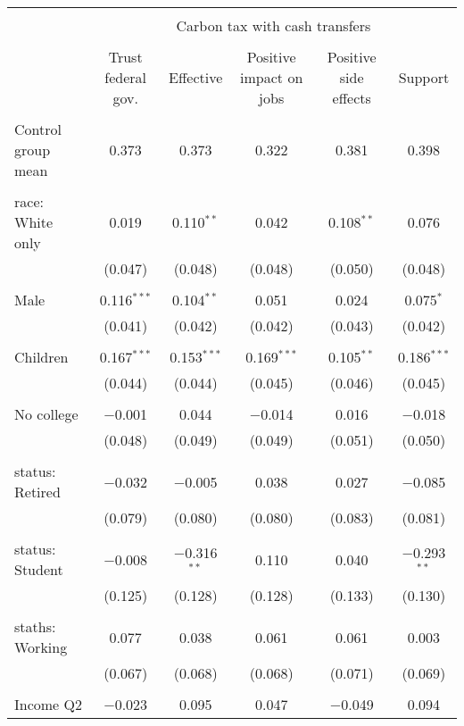 
\begin{tabular}{@{\extracolsep{5pt}}lccccc} 
\\[-1.8ex]\hline 
\hline \\[-1.8ex] 
 & \multicolumn{5}{c}{Carbon tax with cash transfers} \\ 
\cline{2-6} 
\\[-1.8ex] & Trust federal gov. & Effective & Positive impact on jobs & Positive side effects & Support \\ 
\hline \\[-1.8ex] 
 Control group mean & 0.373 & 0.373 & 0.322 & 0.381 & 0.398  \\ \hline \\[-1.8ex] race: White only & 0.019 & 0.110$^{**}$ & 0.042 & 0.108$^{**}$ & 0.076 \\ 
  & (0.047) & (0.048) & (0.048) & (0.050) & (0.048) \\ 
  & & & & & \\ 
 Male & 0.116$^{***}$ & 0.104$^{**}$ & 0.051 & 0.024 & 0.075$^{*}$ \\ 
  & (0.041) & (0.042) & (0.042) & (0.043) & (0.042) \\ 
  & & & & & \\ 
 Children & 0.167$^{***}$ & 0.153$^{***}$ & 0.169$^{***}$ & 0.105$^{**}$ & 0.186$^{***}$ \\ 
  & (0.044) & (0.044) & (0.045) & (0.046) & (0.045) \\ 
  & & & & & \\ 
 No college & $-$0.001 & 0.044 & $-$0.014 & 0.016 & $-$0.018 \\ 
  & (0.048) & (0.049) & (0.049) & (0.051) & (0.050) \\ 
  & & & & & \\ 
 status: Retired & $-$0.032 & $-$0.005 & 0.038 & 0.027 & $-$0.085 \\ 
  & (0.079) & (0.080) & (0.080) & (0.083) & (0.081) \\ 
  & & & & & \\ 
 status: Student & $-$0.008 & $-$0.316$^{**}$ & 0.110 & 0.040 & $-$0.293$^{**}$ \\ 
  & (0.125) & (0.128) & (0.128) & (0.133) & (0.130) \\ 
  & & & & & \\ 
 staths: Working & 0.077 & 0.038 & 0.061 & 0.061 & 0.003 \\ 
  & (0.067) & (0.068) & (0.068) & (0.071) & (0.069) \\ 
  & & & & & \\ 
 Income Q2 & $-$0.023 & 0.095 & 0.047 & $-$0.049 & 0.094 \\ 

\end{tabular}
